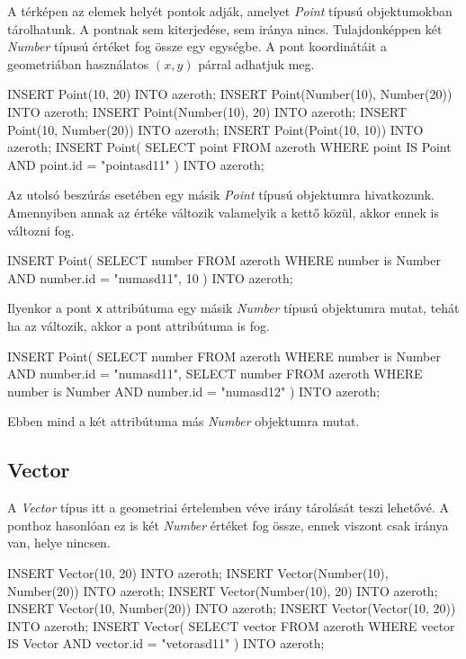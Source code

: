 A térképen az elemek helyét pontok adják, amelyet \textit{Point} típusú objektumokban tárolhatunk. A pontnak sem kiterjedése, sem iránya nincs. Tulajdonképpen két \textit{Number} típusú értéket fog össze egy egységbe. A pont koordinátáit a geometriában használatos $(x, y)$ párral adhatjuk meg.

\begin{sql}
INSERT Point(10, 20) INTO azeroth;
INSERT Point(Number(10), Number(20)) INTO azeroth;
INSERT Point(Number(10), 20) INTO azeroth;
INSERT Point(10, Number(20)) INTO azeroth;
INSERT Point(Point(10, 10)) INTO azeroth;
INSERT Point(
    SELECT point FROM azeroth
    WHERE point IS Point AND point.id = "pointasd11"
) INTO azeroth;
\end{sql}

Az utolsó beszúrás esetében egy másik \textit{Point} típusú objektumra hivatkozunk. Amennyiben annak az értéke változik valamelyik a kettő közül, akkor ennek is változni fog.

\begin{sql}
INSERT Point(
    SELECT number FROM azeroth
    WHERE number is Number AND number.id = "numasd11", 10
) INTO azeroth;
\end{sql}

Ilyenkor a pont \texttt{x} attribútuma egy másik \textit{Number} típusú objektumra mutat, tehát ha az változik, akkor a pont attribútuma is fog.

\begin{sql}
INSERT Point(
    SELECT number FROM azeroth
    WHERE number is Number AND number.id = "numasd11",
    SELECT number FROM azeroth
    WHERE number is Number AND number.id = "numasd12"
) INTO azeroth;
\end{sql}

Ebben mind a két attribútuma más \textit{Number} objektumra mutat.

\subsection{Vector}

A \textit{Vector} típus itt a geometriai értelemben véve irány tárolását teszi lehetővé. A ponthoz hasonlóan ez is két \textit{Number} értéket fog össze, ennek viszont csak iránya van, helye nincsen.

\begin{sql}
INSERT Vector(10, 20) INTO azeroth;
INSERT Vector(Number(10), Number(20)) INTO azeroth;
INSERT Vector(Number(10), 20) INTO azeroth;
INSERT Vector(10, Number(20)) INTO azeroth;
INSERT Vector(Vector(10, 20)) INTO azeroth;
INSERT Vector(
    SELECT vector FROM azeroth
    WHERE vector IS Vector AND vector.id = "vetorasd11"
) INTO azeroth;
\end{sql}


